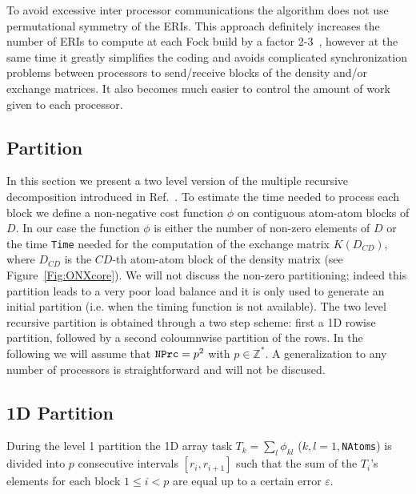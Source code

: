 \documentclass[prl,twocolumn,twocolumngrid,superbib]{revtex4}
\begin{document}
 To avoid excessive inter processor communications the algorithm 
 does not use permutational symmetry of the ERIs. This approach
 definitely increases the number of ERIs to compute at each Fock build by a factor 2-3~\cite{ESchwegler00},
 however at the same time it greatly simplifies the coding and avoids complicated
 synchronization problems between processors to send/receive blocks of the 
 density and/or exchange matrices. It also becomes much 
 easier to control the amount of work given to each processor.



\subsection{Partition}
 In this section we present a two level version of the multiple recursive 
 decomposition introduced in Ref.~\cite{LRomero95}.
 To estimate the time needed to process each block we define
 a non-negative cost function $\phi$ on contiguous atom-atom blocks of
 $D$. In our case the function $\phi$ is either the number of 
 non-zero elements of $D$ or the time {\tt Time} needed for the computation
 of the exchange matrix $K(D_{CD})$, where $D_{CD}$ is the
 $CD$-th atom-atom block of the density matrix (see Figure~\ref{Fig:ONXcore}).
 We will not discuss the non-zero partitioning;
 indeed this partition leads to a very poor load balance and it is
 only used to generate an initial partition (i.e. when 
 the timing function is not available). 
 The two level recursive partition is obtained through 
 a two step scheme: first a 1D rowise partition, followed by a 
 second coloumnwise partition of the rows.
 In the following we will assume that ${\tt NPrc}=p^2$ with $p\in\mathbb{Z}^*$. 
 A generalization to any number of processors is straightforward and will not be discused.

\subsection{1D Partition}
 During the level 1 partition the 1D array task $T_k=\sum_l\phi_{kl}$ ($k,l=1,${\tt NAtoms})
 is divided into $p$ consecutive intervals $[r_i,r_{i+1}]$ such that the sum of the $T_i$'s elements for
 each block $1 \le i < p$ are equal up to a certain error $\varepsilon$. 
\end{document}
